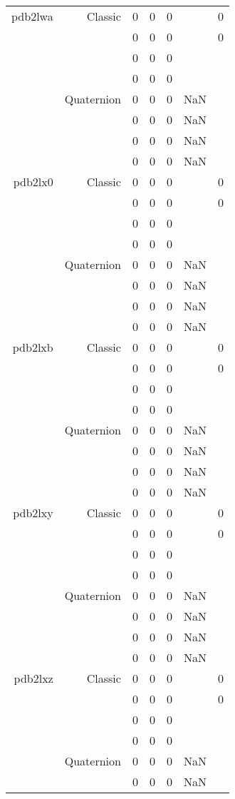 \begin{xltabular}{\textwidth}{r|rcccSc}
pdb2lwa & Classic & 0 & 0 & 0 & & 0 \\
& & 0 & 0 & 0 & & 0 \\
& & 0 & 0 & 0 & & \\
& & 0 & 0 & 0 & & \\
& Quaternion & 0 & 0 & 0 & NaN & \\
& & 0 & 0 & 0 & NaN & \\
& & 0 & 0 & 0 & NaN & \\
& & 0 & 0 & 0 & NaN & \\ \addlinespace
pdb2lx0 & Classic & 0 & 0 & 0 & & 0 \\
& & 0 & 0 & 0 & & 0 \\
& & 0 & 0 & 0 & & \\
& & 0 & 0 & 0 & & \\
& Quaternion & 0 & 0 & 0 & NaN & \\
& & 0 & 0 & 0 & NaN & \\
& & 0 & 0 & 0 & NaN & \\
& & 0 & 0 & 0 & NaN & \\ \addlinespace
pdb2lxb & Classic & 0 & 0 & 0 & & 0 \\
& & 0 & 0 & 0 & & 0 \\
& & 0 & 0 & 0 & & \\
& & 0 & 0 & 0 & & \\
& Quaternion & 0 & 0 & 0 & NaN & \\
& & 0 & 0 & 0 & NaN & \\
& & 0 & 0 & 0 & NaN & \\
& & 0 & 0 & 0 & NaN & \\ \addlinespace
pdb2lxy & Classic & 0 & 0 & 0 & & 0 \\
& & 0 & 0 & 0 & & 0 \\
& & 0 & 0 & 0 & & \\
& & 0 & 0 & 0 & & \\
& Quaternion & 0 & 0 & 0 & NaN & \\
& & 0 & 0 & 0 & NaN & \\
& & 0 & 0 & 0 & NaN & \\
& & 0 & 0 & 0 & NaN & \\ \addlinespace
pdb2lxz & Classic & 0 & 0 & 0 & & 0 \\
& & 0 & 0 & 0 & & 0 \\
& & 0 & 0 & 0 & & \\
& & 0 & 0 & 0 & & \\
& Quaternion & 0 & 0 & 0 & NaN & \\
& & 0 & 0 & 0 & NaN & \\

\end{xltabular}
